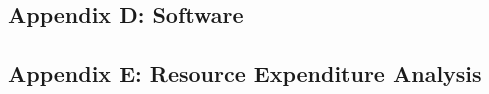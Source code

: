 \documentclass[12pt]{article}
\begin{document}
\subsection{Appendix D: Software}

\subsection{Appendix E: Resource Expenditure Analysis}
\end{document}
